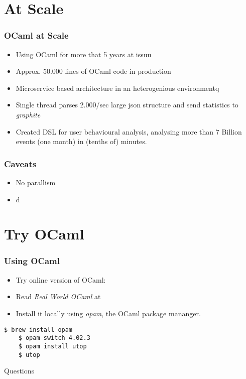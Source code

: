 \documentclass[xcolor=svgnames]{beamer}
\renewcommand{\emph}[1]{{\em #1}}
\renewcommand{\_}{\mathunderscore}
\begin{document}
\section{At Scale}
\begin{frame}[fragile]
  \frametitle{OCaml at Scale}
  \begin{itemize}
  \item Using OCaml for more that 5 years at issuu
  \item Approx. 50.000 lines of OCaml code in production
  \item Microservice based architecture in an heterogenious environmentq
  \item Single thread parses 2.000/sec large json structure and send
    statistics to \textit{graphite}
  \item Created DSL for user behavioural analysis, analysing more than
    7 Billion events (one month) in (tenths of) minutes.
  \end{itemize}
\end{frame}

\begin{frame}[fragile]
  \frametitle{Caveats}
  \begin{itemize}
  \item No parallism
  \item d
  \end{itemize}
\end{frame}

\section{Try OCaml}
\begin{frame}[fragile]
  \frametitle{Using OCaml}
  \begin{itemize}
    \item Try online version of OCaml: 
    \item Read \emph{Real World OCaml} at 
    \item Install it locally using \emph{opam}, the OCaml package mananger.
  \end{itemize}
  \begin{lstlisting}[numbers=none,frame=none]
    $ brew install opam
    $ opam switch 4.02.3
    $ opam install utop
    $ utop
  \end{lstlisting}
\end{frame}

\begin{frame}[fragile]
  \begin{center}
    \LARGE Questions
  \end{center}
\end{frame}
\end{document}
